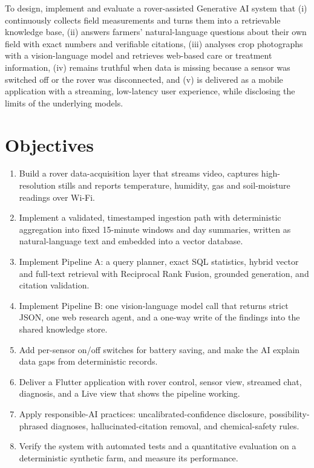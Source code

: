 To design, implement and evaluate a rover-assisted Generative AI system that (i) continuously collects field
measurements and turns them into a retrievable knowledge base, (ii) answers farmers' natural-language questions about
their own field with exact numbers and verifiable citations, (iii) analyses crop photographs with a vision-language model
and retrieves web-based care or treatment information, (iv) remains truthful when data is missing because a sensor was
switched off or the rover was disconnected, and (v) is delivered as a mobile application with a streaming,
low-latency user experience, while disclosing the limits of the underlying models.

\section{Objectives}

\begin{enumerate}[label=O\arabic*.]
\item Build a rover data-acquisition layer that streams video, captures high-resolution stills and reports
      temperature, humidity, gas and soil-moisture readings over Wi-Fi.
\item Implement a validated, timestamped ingestion path with deterministic aggregation into fixed 15-minute windows
      and day summaries, written as natural-language text and embedded into a vector database.
\item Implement Pipeline A: a query planner, exact SQL statistics, hybrid vector and full-text retrieval with
      Reciprocal Rank Fusion, grounded generation, and citation validation.
\item Implement Pipeline B: one vision-language model call that returns strict JSON, one web research agent, and a
      one-way write of the findings into the shared knowledge store.
\item Add per-sensor on/off switches for battery saving, and make the AI explain data gaps from deterministic records.
\item Deliver a Flutter application with rover control, sensor view, streamed chat, diagnosis, and a Live view that
      shows the pipeline working.
\item Apply responsible-AI practices: uncalibrated-confidence disclosure, possibility-phrased diagnoses,
      hallucinated-citation removal, and chemical-safety rules.
\item Verify the system with automated tests and a quantitative evaluation on a deterministic synthetic farm,
      and measure its performance.
\end{enumerate}

